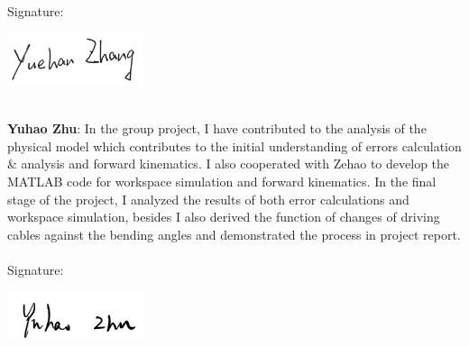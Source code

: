\hspace*{\fill} Signature: \hrulefill
\vspace{-15mm}
\begin{center}
    \hspace{100mm}
    \includegraphics[width=4cm]{Image/Signature/zhangyh.png} 
\end{center}
\qquad \\
\noindent \textbf{Yuhao Zhu}: In the group project, I have contributed to the analysis of the physical model which contributes 
to the initial understanding of errors calculation \& analysis and forward kinematics. I also cooperated with Zehao to develop 
the MATLAB code for workspace simulation and forward kinematics. In the final stage of the project, I analyzed the results of 
both error calculations and workspace simulation, besides I also derived the function of changes of driving cables against the 
bending angles and demonstrated the process in project report. \\
\qquad \\
\hspace*{\fill} Signature: \hrulefill
\vspace{-20mm}
\begin{center}
    \hspace{100mm}
    \includegraphics[width=4cm]{Image/Signature/zhuyh.png} 
\end{center}
\qquad \\



\newpage